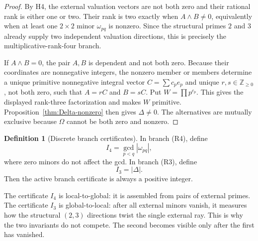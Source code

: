 \documentclass[11pt,oneside]{article}
\theoremstyle{research}
\theoremstyle{definition}
\newtheorem{definition}[theorem]{Definition}
\newcommand{\Z}{\mathbb Z}
\begin{document}
\begin{proof}
By H4, the external valuation vectors are not both zero and their rational
rank is either one or two.  Their rank is two exactly when
$A\wedge B\ne0$, equivalently when at least one $2\times2$ minor
$\omega_{pq}$ is nonzero.  Since the structural primes $2$ and $3$ already
supply two independent valuation directions, this is precisely the
multiplicative-rank-four branch.

If $A\wedge B=0$, the pair $A,B$ is dependent and not both zero.
Because their coordinates are nonnegative integers, the nonzero member or
members determine a unique
primitive nonnegative integral vector
$C=\sum c_pe_p$ and unique $r,s\in\Z_{\ge0}$, not both zero, such that
$A=rC$ and $B=sC$.  Put $W=\prod p^{c_p}$.  This gives the displayed rank-three
factorization and makes $W$ primitive.  Proposition~\ref{thm:Delta-nonzero}
then gives $\Delta\ne0$.  The alternatives are mutually exclusive because
$\Omega$ cannot be both zero and nonzero.
\end{proof}

\begin{definition}[Discrete branch certificates]
\label{def:branch-certificates}
In branch (R4), define
\begin{equation}
 I_4=\gcd_{p<q}|\omega_{pq}|,
 \label{eq:I4}
\end{equation}
where zero minors do not affect the gcd.  In branch (R3), define
\begin{equation}
 I_3=|\Delta|.
 \label{eq:I3}
\end{equation}
Then the active branch certificate is always a positive integer.
\end{definition}

The certificate $I_4$ is local-to-global: it is assembled from pairs of
external primes.  The certificate $I_3$ is global-to-local: after all external
minors vanish, it measures how the structural $(2,3)$ directions twist the
single external ray.  This is why the two invariants do not compete.  The
second becomes visible only after the first has vanished.
\end{document}
